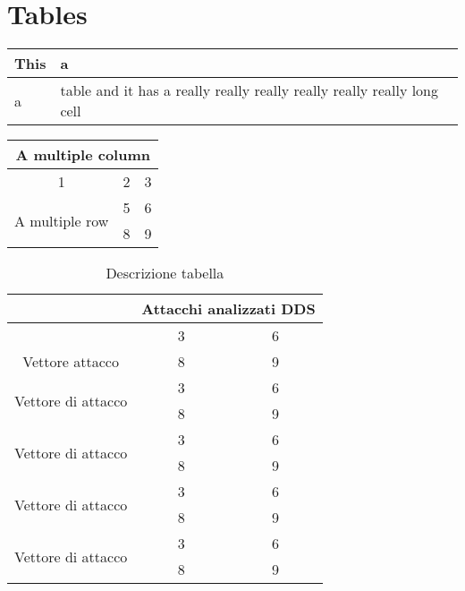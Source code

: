 \setlength{\tabcolsep}{18pt} %
\renewcommand{\arraystretch}{1.5} %
\setlength{\arrayrulewidth}{0.5mm} %


\section{Tables}

\begin{tabular}{|l|b{4cm}|}
    \hline
    This & a\\ \hline
    a & table and it has a really really really really really really long cell \\ \hline
\end{tabular}

\vspace{1in}

\begin{tabular}{|c|c|c|}
    \hline
    \multicolumn{3}{|c|}{A multiple column} \\ \hline
    1 & 2 & 3 \\\hline 
    \multirow{2}{2cm}{A multiple row} & 5 & 6\\
     & 8 & 9 \\ \hline
\end{tabular}


\newpage


\begin{table}[H]

    \begin{tabular}{|c|c|c|}
        \hline
        ~ & \multicolumn{2}{c|}{\cellcolor{black!25}Attacchi analizzati DDS} \\ \hline
        
        \cellcolor{black!25} & 3 & \cellcolor{black!10}6\\
        \multirow{-2}{*}{\cellcolor{black!25}Vettore attacco} & 8 & \cellcolor{black!10}9 \\ \hline

        \multirow{2}{2cm}{Vettore di attacco} & 3 & 6\\
        & 8 & 9 \\ \hline
        \multirow{2}{2cm}{Vettore di attacco} & 3 & 6\\
        & 8 & 9 \\ \hline
        \multirow{2}{2cm}{Vettore di attacco} & 3 & 6\\
        & 8 & 9 \\ \hline
        \multirow{2}{2cm}{Vettore di attacco} & 3 & 6\\
        & 8 & 9 \\ \hline
    \end{tabular}
\caption{Descrizione tabella}
\end{table}


